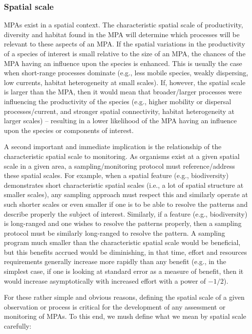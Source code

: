 \documentclass[letterpaper,portrait,11pt]{scrartcl}
\numberwithin{equation}{section}		%
\numberwithin{figure}{section}		%
\numberwithin{table}{section}				%
\begin{document}
\subsubsection{Spatial scale}
\label{sec:interpolationSpatial}

MPAs exist in a spatial context. The characteristic spatial scale of productivity, diversity and habitat found in the MPA will determine which processes will be relevant to these aspects of an MPA. If the spatial variations in the productivity of a species of interest is small relative to the size of an MPA, the chances of the MPA having an influence upon the species is enhanced. This is usually the case when short-range processes dominate (e.g., less mobile species, weakly dispersing, low currents, habitat heterogeneity at small scales). If, however, the spatial scale is larger than the MPA, then it would mean that broader/larger processes were influencing the productivity of the species (e.g., higher mobility or dispersal processes/current, and stronger spatial connectivity, habitat heterogeneity at larger scales) -- resulting in a lower likelihood of the MPA having an influence upon the species or components of interest. 

A second important and immediate implication is the relationship of the characteristic spatial scale to monitoring. As organisms exist at a given spatial scale in a given area, a sampling/monitoring protocol must reference/address these spatial scales. For example, when a spatial feature (e.g., biodiversity) demonstrates short characteristic spatial scales (i.e., a lot of spatial structure at smaller scales), any sampling approach must respect this and similarly operate at such shorter scales or even smaller if one is to be able to resolve the patterns and describe properly the subject of interest. Similarly, if a feature (e.g., biodiversity) is long-ranged and one wishes to resolve the patterns properly, then a sampling protocol must be similarly long-ranged to resolve the pattern. A sampling program much smaller than the characteristic spatial scale would be beneficial, but this benefits accrued would be diminishing, in that time, effort and resources requirements generally increase more rapidly than any benefit (e.g., in the simplest case, if one is looking at standard error as a measure of benefit, then it would increase asymptotically with increased effort with a power of $-1/2$). 

For these rather simple and obvious reasons, defining the spatial scale of a given observation or process is critical for the development of any assessment or monitoring of MPAs. To this end, we mush define what we mean by spatial scale carefully:
\end{document}
